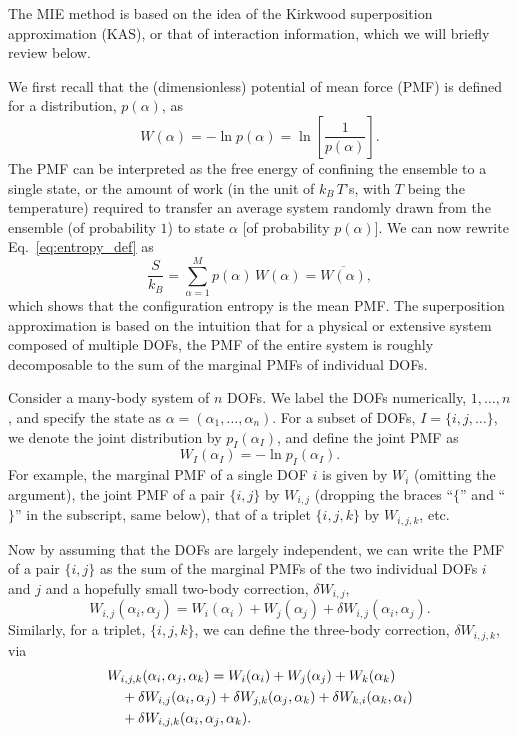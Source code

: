\documentclass[reprint, superscriptaddress]{revtex4-1}
\begin{document}
The MIE method is based on the idea of
the Kirkwood superposition approximation (KAS)\cite{kirkwood1935, born1946},
or that of interaction information\cite{mcgill1954},
which we will briefly review below.

We first recall that the (dimensionless) potential of mean force (PMF)
is defined for a distribution, $p(\alpha)$,
as
$$
W(\alpha) = -\ln p(\alpha) = \ln\left[ \frac{1}{p(\alpha)} \right].
$$
The PMF can be interpreted as
the free energy of confining the ensemble to a single state,
or the amount of work
(in the unit of $k_B \, T$'s, with $T$ being the temperature)
required to transfer an average system randomly drawn from the ensemble (of probability $1$)
to state $\alpha$ [of probability $p(\alpha)$].
%
We can now rewrite Eq.~\eqref{eq:entropy_def} as
%
\begin{equation}
  \frac{S}{k_B}
  =
  \sum_{\alpha = 1}^M p(\alpha) \, W(\alpha)
  =
  \overline{ W(\alpha) }
  ,
  \label{eq:S_W}
\end{equation}
%
which shows that the configuration entropy
is the mean PMF.
%
The superposition approximation is based on the intuition
that for a physical or extensive system composed of multiple DOFs,
the PMF of the entire system is roughly decomposable to
the sum of the marginal PMFs of individual DOFs.

Consider a many-body system of $n$ DOFs.
%
We label the DOFs numerically, $1, \dots, n$,
and specify the state as $\alpha = (\alpha_1, \dots, \alpha_n)$.
%
%
For a subset of DOFs, $I = \{i, j, \dots\}$,
we denote the joint distribution by $p_I(\alpha_I)$,
and define the joint PMF as
%
\begin{equation}
  W_I(\alpha_I) = -\ln p_I(\alpha_I)
  .
  \label{eq:WI_def}
\end{equation}
%
For example,
the marginal PMF of a single DOF $i$ is given by $W_i$ (omitting the argument),
the joint PMF of a pair $\{i, j\}$ by $W_{i, j}$
(dropping the braces ``$\{$'' and ``$\}$'' in the subscript, same below),
that of a triplet $\{i, j, k\}$ by $W_{i, j, k}$, etc.

Now by assuming that the DOFs are largely independent,
we can write the PMF of a pair $\{i, j\}$
as the sum of the marginal PMFs of the two individual DOFs $i$ and $j$
and a hopefully small two-body correction, $\delta W_{i,j}$,
%
\begin{equation}
  W_{i,j}(\alpha_i, \alpha_j)
  =
  W_i(\alpha_i) + W_j(\alpha_j)
  + \delta W_{i,j}(\alpha_i, \alpha_j)
  .
  \label{eq:W_ij}
\end{equation}
%
Similarly, for a triplet, $\{i, j, k\}$,
we can define the three-body correction, $\delta W_{i,j,k}$, via
%
\begin{align}
  &W_{i,j,k}(\alpha_i, \alpha_j, \alpha_k)
  =
  W_i(\alpha_i) + W_j(\alpha_j) + W_k(\alpha_k)
  \notag \\
  &\quad
  + \delta W_{i,j}(\alpha_i, \alpha_j)
  + \delta W_{j,k}(\alpha_j, \alpha_k)
  + \delta W_{k,i}(\alpha_k, \alpha_i)
  \notag \\
  &\quad
  + \delta W_{i,j,k}(\alpha_i, \alpha_j, \alpha_k)
  .
  \label{eq:W_ijk}
\end{align}
%
\end{document}
